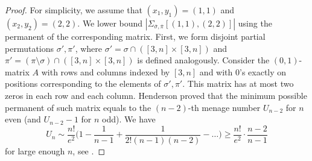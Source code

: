 \documentclass[11pt]{extarticle}
\numberwithin{equation}{section} %
\theoremstyle{plain}
\theoremstyle{definition}
\begin{document}
\begin{proof}
    For simplicity, we assume that $(x_1,y_1) = (1,1)$ and $(x_2,y_2) = (2,2)$. We lower bound  $|\Sigma_{\overline{\sigma}, \overline{\pi}}[(1,1), (2, 2)]|$ using the permanent of the corresponding matrix. First, we form disjoint partial permutations $\sigma',\pi'$, where $\sigma'=\sigma\cap ([3,n]\times [3,n])$ and $ \pi'=(\pi\setminus\sigma)\cap ([3,n]\times [3,n])$ is defined analogously. Consider the $(0,1)$-matrix $A$ with rows and columns indexed by $[3,n]$ and with $0$'s exactly on positions corresponding to the elements of  $\sigma',\pi'$. This matrix has at most two zeros in each row and each column. Henderson proved \cite{He} that the minimum possible permanent of such matrix equals to the $(n-2)$-th menage number $U_{n-2}$ for $n$ even (and $U_{n-2} - 1$ for $n$ odd). We have  $$U_n \sim \frac{n!}{e^2}\Big(1 - \frac{1}{n-1}+\frac{1}{2!(n-1)(n-2)}-\dots\Big)\ge \frac{n!}{e^2} \cdot\frac{n-2}{n-1}  $$ for large enough $n$,  see \cite{MN}. 
    
    
    

    

\end{proof}
\end{document}
